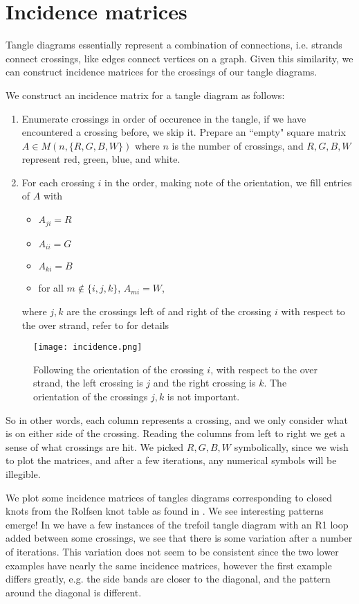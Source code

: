 \section{Incidence matrices}

Tangle diagrams essentially represent a combination of connections, i.e. strands connect crossings, like edges connect vertices on a graph. Given this similarity, we can construct incidence matrices for the crossings of our tangle diagrams. 

We construct an incidence matrix for a tangle diagram as follows:

\begin{enumerate}
\item Enumerate crossings in order of occurence in the tangle, if we have encountered a crossing before, we skip it. Prepare an ``empty" square matrix $A\in M(n,\{R,G,B,W\})$ where $n$ is the number of crossings, and $R,G,B,W$ represent red, green, blue, and white.
\item For each crossing $i$ in the order, making note of the orientation, we fill entries of $A$ with
\begin{itemize}
\item $A_{ji}=R$
\item $A_{ii}=G$
\item $A_{ki}=B$
\item for all $m\not\in\{i,j,k\}$, $A_{mi}=W$, 
\end{itemize}
where $j,k$ are the crossings left of and right of the crossing $i$ with respect to the over strand, refer to  for details
\end{enumerate}

\begin{figure}[h!]
\centering
\texttt{[image: incidence.png]}
\caption{Following the orientation of the crossing $i$, with respect to the over strand, the left crossing is $j$ and the right crossing is $k$. The orientation of the crossings $j,k$ is not important.}
\label{fig:incidence}
\end{figure}

So in other words, each column represents a crossing, and we only consider what is on either side of the crossing. Reading the columns from left to right we get a sense of what crossings are hit. We picked $R,G,B,W$ symbolically, since we wish to plot the matrices, and after a few iterations, any numerical symbols will be illegible. 

We plot some incidence matrices of tangles diagrams corresponding to closed knots from the Rolfsen knot table as found in \citep{rolfsen}. We see interesting patterns emerge! In  we have a few instances of the trefoil tangle diagram with an R1 loop added between some crossings, we see that there is some variation after a number of iterations. This variation does not seem to be consistent since the two lower examples have nearly the same incidence matrices, however the first example differs greatly, e.g. the side bands are closer to the diagonal, and the pattern around the diagonal is different.

